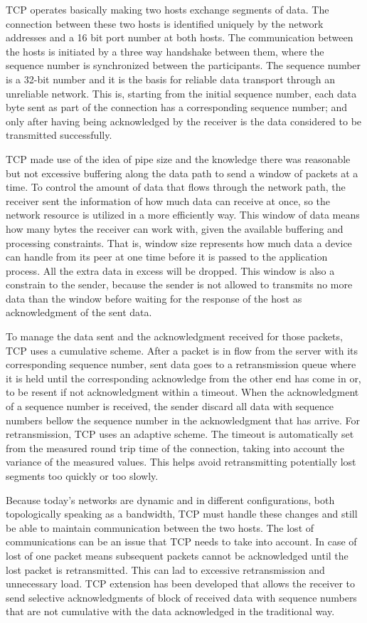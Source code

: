 TCP operates basically making two hosts exchange segments of data. The
connection between these two hosts is identified uniquely by the network addresses and a 16 bit port number at both hosts. The communication between the
hosts is initiated by a three way handshake between them, where the
sequence number is synchronized between the participants. The sequence number
is a 32-bit number and it is the basis for reliable data transport through an unreliable network. This is, starting from the initial sequence
number, each data byte sent as part of the connection has a corresponding
sequence number; and only after having being acknowledged by the receiver is
the data considered to be transmitted successfully.

TCP made use of the idea of pipe size and the knowledge there was reasonable
but not excessive buffering along the data path to send a window of packets at
a time. To control the amount of data that flows through the network path, the
receiver sent the information of how much data can receive at once, so the
network resource is utilized in a more efficiently way. This window of data
means how many bytes the receiver can work with, given the available buffering
and processing constraints. That is, window size represents how much data a
device can handle from its peer at one time before it is passed to the
application process. All the extra data in excess will be dropped. This window
is also a constrain to the sender, because the sender is not allowed to
transmits no more data than the window before waiting for the response of the
host as acknowledgment of the sent data.

To manage the data sent and the acknowledgment received for those packets, TCP
uses a cumulative scheme. After a packet is in flow from the server with its
corresponding sequence number, sent data goes to a retransmission queue where
it is held until the corresponding acknowledge from the other end has come in
or, to be resent if not acknowledgment within a timeout. When the
acknowledgment of a sequence number is received, the sender discard all data
with sequence numbers bellow the sequence number in the acknowledgment that
has arrive. For retransmission, TCP uses an adaptive scheme. The timeout is
automatically set from the measured round trip time of the connection,
taking into account the variance of the measured values\cite{JacobsonCAC}.
This helps avoid retransmitting potentially lost segments too quickly or too
slowly.

Because today's networks are dynamic and in different configurations, both
topologically speaking as a  bandwidth, TCP must handle these changes and
still be able to maintain communication between the two hosts. The lost of
communications can be an issue that TCP needs to take into account. In case of
lost of one packet means subsequent packets cannot be acknowledged until the
lost packet is retransmitted. This can lad to excessive retransmission and
unnecessary load. TCP extension has been developed that allows the receiver to
send selective acknowledgments of block of received data with sequence numbers
that are not cumulative with the data acknowledged in the traditional
way\cite{RFC2018}.

